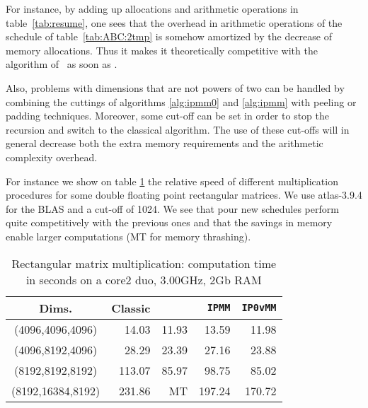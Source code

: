 \documentclass{article}
\newcommand{\dhss}{\cite{Douglas:1994:gemmw}\xspace}
\begin{document}
For instance, by adding up allocations and arithmetic operations in table~\ref{tab:resume},
one sees that the overhead in arithmetic operations of the schedule of table~\ref{tab:ABC:2tmp}
is somehow amortized by the decrease of memory allocations. Thus it makes it
theoretically competitive with the algorithm
of~\cite{Huss-Lederman:1996:mai} as soon as .



Also, problems with dimensions that are not powers of two can be handled 
by combining the cuttings of algorithms \ref{alg:ipmm0} and
\ref{alg:ipmm} with peeling or padding techniques. Moreover,
some cut-off can be set in order to stop the recursion and switch
to the classical algorithm. The use of these cut-offs
will in general decrease both the extra memory requirements and the arithmetic
complexity overhead.

For instance we show on table \ref{tab:ipmmperf} the relative speed of
different multiplication procedures for some double floating point 
rectangular matrices. We use atlas-3.9.4 for the BLAS and a cut-off
of 1024.
We see that pour new schedules perform quite competitively with the
previous ones and that the savings in memory enable larger
computations (MT for memory thrashing).
\begin{table}[htbp]\center
\begin{tabular}{|c||r|r|r|r|}
\hline
Dims.  & Classic & \dhss{} & \texttt{IPMM} & \texttt{IP0vMM} \\
\hline
(4096,4096,4096)  & 14.03  & 11.93   & 13.59  & 11.98\\
(4096,8192,4096)  & 28.29  & 23.39   & 27.16  & 23.88  \\
(8192,8192,8192)  & 113.07 & 85.97   & 98.75  & 85.02\\
(8192,16384,8192) & 231.86 & MT      & 197.24 & 170.72\\
\hline
\end{tabular}
\caption{Rectangular matrix multiplication: computation time in seconds  on a core2 duo,
  3.00GHz, 2Gb RAM}\label{tab:ipmmperf}
\end{table}



\newcommand{\SortNoop}[1]{}
\end{document}
